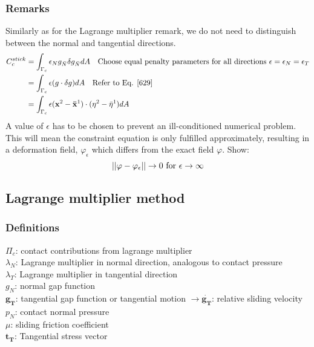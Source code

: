 \documentclass[12pt,3p]{article}
\numberwithin{equation}{section}
\begin{document}
\subsubsection{Remarks}
Similarly as for the Lagrange multiplier remark, we do not need to distinguish between the normal and tangential directions. 
\begin{align}
\begin{split}
C_c^{stick} &= \int_{\Gamma_c} \epsilon_N g_{\bar{N}} \delta g_{\bar{N}} dA \quad \text{Choose equal penalty parameters for all directions } \epsilon = \epsilon_N = \epsilon_T \\
		  &= \int_{\Gamma_c} \epsilon (g \cdot \delta g) dA \quad \text{Refer to Eq. \ref{629}} \\
		  &= \int_{\Gamma_c} \epsilon (\mathbf{x}^2 - \mathbf{\bar{x}}^1) \cdot (\eta^2 - \bar{\eta}^1) dA
\end{split}
\end{align}
A value of $\epsilon$ has to be chosen to prevent an ill-conditioned numerical problem. This will mean the constraint equation is only fulfilled approximately, resulting in a deformation field, $\varphi_\epsilon$ which differs from the exact field $\varphi$. Show:
\begin{equation*}
\abs{\abs{\varphi - \varphi_\epsilon}} \rightarrow 0 \text{ for } \epsilon \rightarrow \infty
\end{equation*}

\subsection{Lagrange multiplier method}
\subsubsection{Definitions}
$\Pi_c$: contact contributions from lagrange multiplier \\
$\lambda_N$: Lagrange multiplier in normal direction, analogous to contact pressure \\
$\lambda_T$: Lagrange multiplier in tangential direction \\
$g_N$: normal gap function \\
$\mathbf{g_T}$: tangential gap function or tangential motion $\rightarrow \mathbf{\dot{g_T}}$: relative sliding velocity \\
$p_N$: contact normal pressure \\
$\mu$: sliding friction coefficient \\
$\mathbf{t_T}$: Tangential stress vector 
\end{document}
